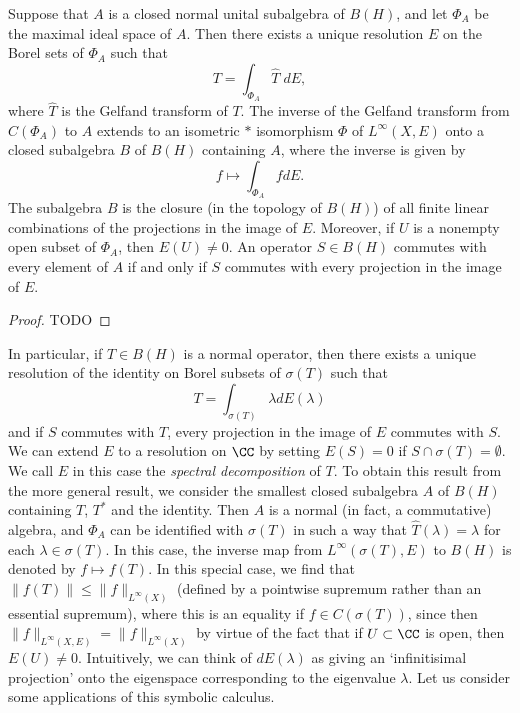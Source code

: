 \begin{theorem}
    Suppose that $A$ is a closed normal unital subalgebra of $B(H)$, and let $\Phi_A$ be the maximal ideal space of $A$. Then there exists a unique resolution $E$ on the Borel sets of $\Phi_A$ such that
    \[ T = \int_{\Phi_A} \widehat{T}\; dE, \]
    where $\widehat{T}$ is the Gelfand transform of $T$. The inverse of the Gelfand transform from $C(\Phi_A)$ to $A$ extends to an isometric $*$ isomorphism $\Phi$ of $L^\infty(X,E)$ onto a closed subalgebra $B$ of $B(H)$ containing $A$, where the inverse is given by
    \[ f \mapsto \int_{\Phi_A} f dE. \]
    The subalgebra $B$ is the closure (in the topology of $B(H)$) of all finite linear combinations of the projections in the image of $E$. Moreover, if $U$ is a nonempty open subset of $\Phi_A$, then $E(U) \neq 0$. An operator $S \in B(H)$ commutes with every element of $A$ if and only if $S$ commutes with every projection in the image of $E$.
\end{theorem}
\begin{proof}
    TODO
\end{proof}

In particular, if $T \in B(H)$ is a normal operator, then there exists a unique resolution of the identity on Borel subsets of $\sigma(T)$ such that
%
\[ T = \int_{\sigma(T)} \lambda dE(\lambda) \]
%
and if $S$ commutes with $T$, every projection in the image of $E$ commutes with $S$. We can extend $E$ to a resolution on $\CC$ by setting $E(S) = 0$ if $S \cap \sigma(T) = \emptyset$. We call $E$ in this case the \emph{spectral decomposition} of $T$. To obtain this result from the more general result, we consider the smallest closed subalgebra $A$ of $B(H)$ containing $T$, $T^*$ and the identity. Then $A$ is a normal (in fact, a commutative) algebra, and $\Phi_A$ can be identified with $\sigma(T)$ in such a way that $\widehat{T}(\lambda) = \lambda$ for each $\lambda \in \sigma(T)$. In this case, the inverse map from $L^\infty(\sigma(T),E)$ to $B(H)$ is denoted by $f \mapsto f(T)$. In this special case, we find that $\| f(T) \| \leq \| f \|_{L^\infty(X)}$ (defined by a pointwise supremum rather than an essential supremum), where this is an equality if $f \in C(\sigma(T))$, since then $\| f \|_{L^\infty(X,E)} = \| f \|_{L^\infty(X)}$ by virtue of the fact that if $U \subset \CC$ is open, then $E(U) \neq 0$. Intuitively, we can think of $dE(\lambda)$ as giving an `infinitisimal projection' onto the eigenspace corresponding to the eigenvalue $\lambda$. Let us consider some applications of this symbolic calculus.

